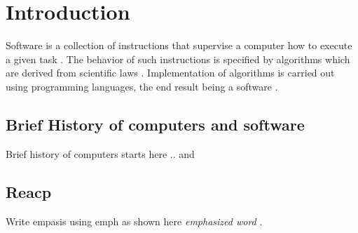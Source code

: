 \chapter{Introduction}
\label{ch:intro}
Software is a collection of instructions that supervise a computer how to execute a given task \citep{enwiki:1056292826}. The behavior of such instructions is specified by algorithms which are derived from scientific laws \citep{wolfram1984computer}.  Implementation of algorithms is carried out using programming languages, the end result being a software \citep{enwiki:1055624679, enwiki:1055665216}. 


\section{Brief History of computers and software}

Brief history of computers starts here .. and 
%
%
\section{Reacp}
\label{sec:intro:reacp}
{}
Write empasis using emph as shown here \emph{emphasized word} .



